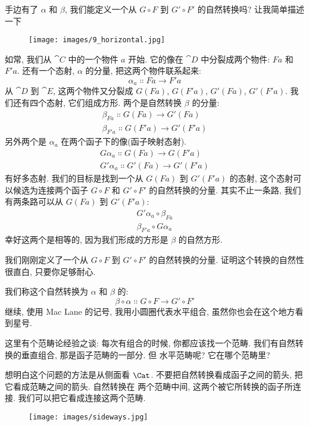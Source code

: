 手边有了 $\alpha$ 和 $\beta$, 我们能定义一个从 $G \circ F$ 到 $G' \circ F'$ 的自然转换吗? 让我简单描述一下

\begin{figure}[H]
  \centering
  \texttt{[image: images/9\_horizontal.jpg]}
\end{figure}

\noindent
如常, 我们从 $\cat{C}$ 中的一个物件 $a$ 开始. 它的像在 $\cat{D}$ 中分裂成两个物件: $F a$ 和 $F' a$.
还有一个态射, $\alpha$ 的分量, 把这两个物件联系起来:
\[\alpha_a \Colon F a \to F'a\]
从 $\cat{D}$ 到 $\cat{E}$, 这两个物件又分裂成 $G (F a)$, $G (F'a)$, $G'(F a)$, $G'(F'a)$.
我们还有四个态射, 它们组成方形. 两个是自然转换 $\beta$ 的分量:
\begin{gather*}
  \beta_{F a} \Colon G (F a) \to G'(F a) \\
  \beta_{F'a} \Colon G (F'a) \to G'(F'a)
\end{gather*}
另外两个是 $\alpha_a$ 在两个函子下的像(函子映射态射).
\begin{gather*}
  G \alpha_a \Colon G (F a) \to G (F'a) \\
  G'\alpha_a \Colon G'(F a) \to G'(F'a)
\end{gather*}
有好多态射. 我们的目标是找到一个从 $G (F a)$ 到 $G'(F'a)$ 的态射, 这个态射可以候选为连接两个函子 $G \circ F$
和 $G' \circ F'$ 的自然转换的分量. 其实不止一条路, 我们有两条路可以从 $G (F a)$ 到 $G'(F'a)$:
\begin{gather*}
  G'\alpha_a \circ \beta_{F a} \\
  \beta_{F'a} \circ G \alpha_a
\end{gather*}
幸好这两个是相等的, 因为我们形成的方形是 $\beta$ 的自然方形.

我们刚刚定义了一个从 $G \circ F$ 到 $G' \circ F'$ 的自然转换的分量. 证明这个转换的自然性很直白, 只要你足够耐心.

我们称这个自然转换为 $\alpha$ 和 $\beta$ 的:
\[\beta \circ \alpha \Colon G \circ F \to G' \circ F'\]
继续, 使用 Mac Lane 的记号, 我用小圆圈代表水平组合, 虽然你也会在这个地方看到星号.

这里有个范畴论经验之谈: 每次有组合的时候, 你都应该找一个范畴. 我们有自然转换的垂直组合, 那是函子范畴的一部分. 但
水平范畴呢? 它在哪个范畴里?

想明白这个问题的方法是从侧面看 $\Cat$. 不要把自然转换看成函子之间的箭头, 把它看成范畴之间的箭头. 自然转换在
两个范畴中间, 这两个被它所转换的函子所连接. 我们可以把它看成连接这两个范畴.

\begin{figure}[H]
  \centering
  \texttt{[image: images/sideways.jpg]}
\end{figure}

